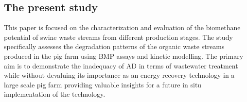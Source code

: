 \subsection{The present study}
This paper is focused on the characterization and evaluation of the biomethane potential of swine waste streams from different production stages. The study specifically assesses the degradation patterns of the organic waste streams produced in the pig farm using BMP assays and kinetic modelling. The primary aim is to demonstrate the inadequacy of AD in terms of wastewater treatment while  without devaluing its importance as an energy recovery technology in a large scale pig farm providing valuable insights for a future in situ implementation of the technology.